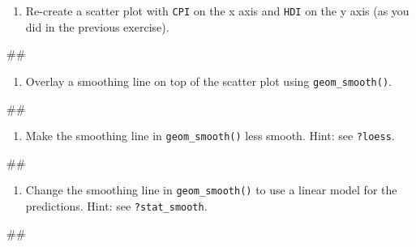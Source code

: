 \documentclass[]{book}
\newenvironment{Shaded}{\begin{snugshade}}{\end{snugshade}}
\newcommand{\NormalTok}[1]{#1}
\providecommand{\tightlist}{%
  \setlength{\itemsep}{0pt}\setlength{\parskip}{0pt}}
\begin{document}
\begin{enumerate}
\def\labelenumi{\arabic{enumi}.}
\tightlist
\item
  Re-create a scatter plot with \texttt{CPI} on the x axis and
  \texttt{HDI} on the y axis (as you did in the previous exercise).
\end{enumerate}

\begin{Shaded}
\begin{Highlighting}[]
\NormalTok{## }
\end{Highlighting}
\end{Shaded}

\begin{enumerate}
\def\labelenumi{\arabic{enumi}.}
\setcounter{enumi}{1}
\tightlist
\item
  Overlay a smoothing line on top of the scatter plot using
  \texttt{geom\_smooth()}.
\end{enumerate}

\begin{Shaded}
\begin{Highlighting}[]
\NormalTok{## }
\end{Highlighting}
\end{Shaded}

\begin{enumerate}
\def\labelenumi{\arabic{enumi}.}
\setcounter{enumi}{2}
\tightlist
\item
  Make the smoothing line in \texttt{geom\_smooth()} less smooth. Hint:
  see \texttt{?loess}.
\end{enumerate}

\begin{Shaded}
\begin{Highlighting}[]
\NormalTok{## }
\end{Highlighting}
\end{Shaded}

\begin{enumerate}
\def\labelenumi{\arabic{enumi}.}
\setcounter{enumi}{3}
\tightlist
\item
  Change the smoothing line in \texttt{geom\_smooth()} to use a linear
  model for the predictions. Hint: see \texttt{?stat\_smooth}.
\end{enumerate}

\begin{Shaded}
\begin{Highlighting}[]
\NormalTok{## }
\end{Highlighting}
\end{Shaded}
\end{document}
